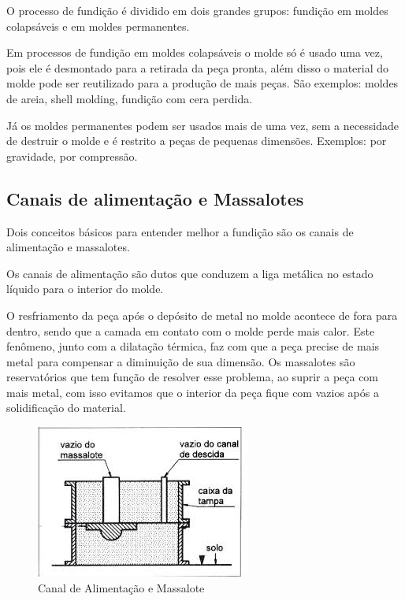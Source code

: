 \documentclass[a4paper, 12pt]{article}
\begin{document}
	O processo de fundição é dividido em dois grandes grupos: fundição em moldes colapsáveis e em moldes permanentes.
	
	Em processos de fundição em moldes colapsáveis o molde só é usado uma vez, pois ele é desmontado para a retirada da peça pronta, além disso o material do molde pode ser reutilizado para a produção de mais peças. São exemplos: moldes de areia, shell molding, fundição com cera perdida.
	
	Já os moldes permanentes podem ser usados mais de uma vez, sem a necessidade de destruir o molde e é restrito a peças de pequenas dimensões. Exemplos: por gravidade, por compressão.

	\subsection{Canais de alimentação e Massalotes}
	Dois conceitos básicos para entender melhor a fundição são os canais de alimentação e massalotes. 
	
	Os canais de alimentação são dutos que conduzem a liga metálica no estado líquido para o interior do molde.
	
	O resfriamento da peça após o depósito de metal no molde acontece de fora para dentro, sendo que a camada em contato com o molde perde mais calor. Este fenômeno, junto com a dilatação térmica, faz com que a peça precise de mais metal para compensar a diminuição de sua dimensão. Os massalotes são reservatórios que tem função de resolver esse problema, ao suprir a peça com mais metal, com isso evitamos que o interior da peça fique com vazios após a solidificação do material.
	\begin{figure}[h]
			\centering
			\includegraphics[scale=0.5]{a.jpeg}
			\caption{Canal de Alimentação e Massalote}
		\end{figure}
\end{document}
